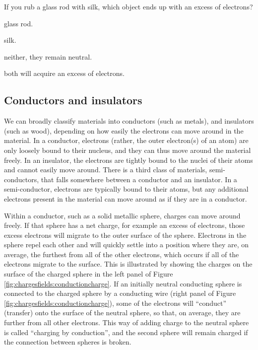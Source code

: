 \begin{checkpoint}\label{cp:chargesfields:tribo}
\begin{MCquestion}{If you rub a glass rod with silk, which object ends up with an excess of electrons?}
\item glass rod.
\item silk. \correct
\item neither, they remain neutral.
\item both will acquire an excess of electrons.
\end{MCquestion}
\end{checkpoint}

\subsection{Conductors and insulators}
We can broadly classify materials into conductors (such as metals), and insulators (such as wood), depending on how easily the electrons can move around in the material. In a conductor, electrons (rather, the outer electron(s) of an atom) are only loosely bound to their nucleus, and they can thus move around the material freely. In an insulator, the electrons are tightly bound to the nuclei of their atoms and cannot easily move around. There is a third class of materials, semi-conductors, that falls somewhere between a conductor and an insulator. In a semi-conductor, electrons are typically bound to their atoms, but any additional electrons present in the material can move around as if they are in a conductor. 

Within a conductor, such as a solid metallic sphere, charges can move around freely. If that sphere has a net charge, for example an excess of electrons, those excess electrons will migrate to the outer surface of the sphere. Electrons in the sphere repel each other and will quickly settle into a position where they are, on average, the furthest from all of the other electrons, which occurs if all of the electrons migrate to the surface. This is illustrated by showing the charges on the surface of the charged sphere in the left panel of Figure \ref{fig:chargesfields:conductioncharge}. If an initially neutral conducting sphere is connected to the charged sphere by a conducting wire (right panel of Figure \ref{fig:chargesfields:conductioncharge}), some of the electrons will ``conduct'' (transfer) onto the surface of the neutral sphere, so that, on average, they are further from all other electrons. This way of adding charge to the neutral sphere is called ``charging by conduction'', and the second sphere will remain charged if the connection between spheres is broken.

